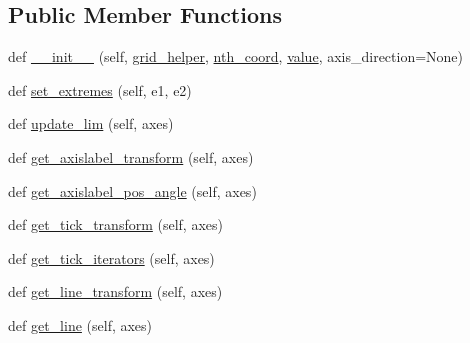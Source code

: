 \subsection*{Public Member Functions}
\begin{DoxyCompactItemize}
\item 
def \hyperlink{classaxisartist_1_1grid__helper__curvelinear_1_1FloatingAxisArtistHelper_aea4c2844ea83c41a4c2167f59ecf7788}{\+\_\+\+\_\+init\+\_\+\+\_\+} (self, \hyperlink{classaxisartist_1_1grid__helper__curvelinear_1_1FloatingAxisArtistHelper_ae3c2d117daee0e3e929b8494e7714545}{grid\+\_\+helper}, \hyperlink{classaxisartist_1_1grid__helper__curvelinear_1_1FloatingAxisArtistHelper_ade8f0d379f93dc76a461c719c21752f8}{nth\+\_\+coord}, \hyperlink{classaxisartist_1_1grid__helper__curvelinear_1_1FloatingAxisArtistHelper_acd3723c5d6ac4b0f39b0d19d4dcaeb2e}{value}, axis\+\_\+direction=None)
\item 
def \hyperlink{classaxisartist_1_1grid__helper__curvelinear_1_1FloatingAxisArtistHelper_ac9ac70c68b6bf18448637aaa25075be3}{set\+\_\+extremes} (self, e1, e2)
\item 
def \hyperlink{classaxisartist_1_1grid__helper__curvelinear_1_1FloatingAxisArtistHelper_ac4c0643b18f276df9dd3794e1984bf67}{update\+\_\+lim} (self, axes)
\item 
def \hyperlink{classaxisartist_1_1grid__helper__curvelinear_1_1FloatingAxisArtistHelper_aad0a42d3af6a20ce2418ee120883c27a}{get\+\_\+axislabel\+\_\+transform} (self, axes)
\item 
def \hyperlink{classaxisartist_1_1grid__helper__curvelinear_1_1FloatingAxisArtistHelper_a2e939820d0fae06397a5d59b2b789abc}{get\+\_\+axislabel\+\_\+pos\+\_\+angle} (self, axes)
\item 
def \hyperlink{classaxisartist_1_1grid__helper__curvelinear_1_1FloatingAxisArtistHelper_abc7686e364f9cf4b59045c0a662d9fdf}{get\+\_\+tick\+\_\+transform} (self, axes)
\item 
def \hyperlink{classaxisartist_1_1grid__helper__curvelinear_1_1FloatingAxisArtistHelper_acba7027f6648870deb54be1f7ba53867}{get\+\_\+tick\+\_\+iterators} (self, axes)
\item 
def \hyperlink{classaxisartist_1_1grid__helper__curvelinear_1_1FloatingAxisArtistHelper_a5390076ebc5d31e1b129738031c06f8f}{get\+\_\+line\+\_\+transform} (self, axes)
\item 
def \hyperlink{classaxisartist_1_1grid__helper__curvelinear_1_1FloatingAxisArtistHelper_a36dd3a0c8e4453b7152cba57e99c0174}{get\+\_\+line} (self, axes)
\end{DoxyCompactItemize}
